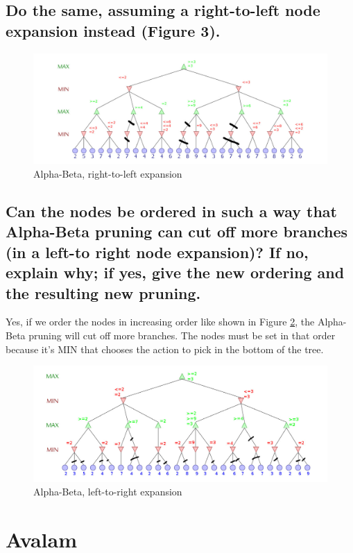 \documentclass[10pt,a4paper]{article}
\begin{document}
\subsection{Do the same, assuming a right-to-left node expansion instead (Figure 3).}

\begin{figure}[h]
\includegraphics[scale=0.4]{img/alphabeta_right.jpg} 
\caption{\label{alphabetaright} Alpha-Beta, right-to-left expansion}
\end{figure}

\subsection{Can the nodes be ordered in such a way that Alpha-Beta pruning can cut off more branches (in a left-to right node expansion)? If no, explain why; if yes, give the new ordering and the resulting new pruning.}

Yes, if we order the nodes in increasing order like shown in Figure \ref{alphabetanodes}, the Alpha-Beta pruning will cut off more branches. The nodes must be set in that order because it's MIN that chooses the action to pick in the bottom of the tree.

\begin{figure}[h]
\includegraphics[scale=0.4]{img/alphabeta_nodes.jpg} 
\caption{\label{alphabetanodes} Alpha-Beta, left-to-right expansion}
\end{figure}

\section{Avalam}
\end{document}
